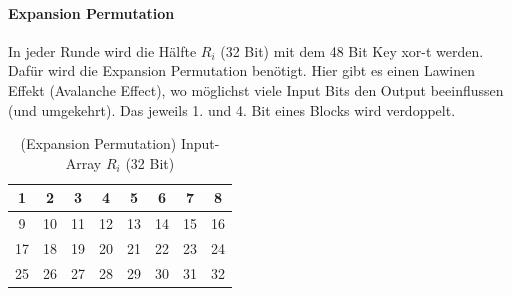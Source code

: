 \paragraph{Expansion Permutation}

In jeder Runde wird die Hälfte $R_i$ (32 Bit) mit dem 48 Bit Key xor-t werden. Dafür wird die Expansion Permutation  benötigt. Hier gibt
es einen Lawinen Effekt (Avalanche Effect), wo möglichst viele Input Bits den Output beeinflussen (und umgekehrt). Das jeweils 1. und 4. Bit eines Blocks wird verdoppelt.

\begin{table}[h]
    \centering
    \begin{tabular}{|*{8}{c|}}
        \hline
        \cellcolor{red-1}1 & \cellcolor{red-1}2 & \cellcolor{red-1}3 & \cellcolor{red-1}4 & 
        \cellcolor{red-1}5 & \cellcolor{red-1}6 & \cellcolor{red-1}7 & \cellcolor{red-1}8 \\
        \hline 
        \cellcolor{orange-1}9 & \cellcolor{orange-1}10 & \cellcolor{orange-1}11 & \cellcolor{orange-1}12 & 
        \cellcolor{orange-1}13 & \cellcolor{orange-1}14 & \cellcolor{orange-1}15 & \cellcolor{orange-1}16 \\
        \hline 
        \cellcolor{yellow-1}17 & \cellcolor{yellow-1}18 & \cellcolor{yellow-1}19 & \cellcolor{yellow-1}20 & 
        \cellcolor{yellow-1}21 & \cellcolor{yellow-1}22 & \cellcolor{yellow-1}23 & \cellcolor{yellow-1}24 \\
        \hline
        \cellcolor{green-1}25 & \cellcolor{green-1}26 & \cellcolor{green-1}27 & \cellcolor{green-1}28 &
        \cellcolor{green-1}29 & \cellcolor{green-1}30 & \cellcolor{green-1}31 & \cellcolor{green-1}32 \\
        \hline 
    \end{tabular}
    \caption{(Expansion Permutation) Input-Array $R_i$ (32 Bit)}
\end{table}

